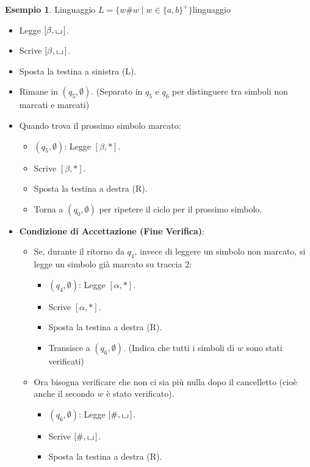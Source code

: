 \documentclass[a4paper]{article}
\theoremstyle{definition} %
\newtheorem{example}{Esempio}
\newcommand{\blankS}{\ensuremath{\raisebox{-0.15ex}{\scalebox{1.3}[0.7]{$\sqcup$}}\mkern2mu}}
\begin{document}
\begin{example}{Linguaggio $L = \{w\#w \mid w \in \{a,b\}^+\}$}{linguaggio}
\begin{itemize}
\begin{itemize}
            \item Legge $[\beta, \blankS]$.
            \item Scrive $[\beta, \blankS]$.
            \item Sposta la testina a sinistra (L).
            \item Rimane in $(q_5, \emptyset)$. (Separato in $q_5$ e $q_6$ per distinguere tra simboli non marcati e marcati)
            \item Quando trova il prossimo simbolo marcato:
                \begin{itemize}
                    \item $(q_5, \emptyset)$: Legge $[\beta, *]$.
                    \item Scrive $[\beta, *]$.
                    \item Sposta la testina a destra (R).
                    \item Torna a $(q_0, \emptyset)$ per ripetere il ciclo per il prossimo simbolo.
                \end{itemize}
            \item \textbf{Condizione di Accettazione (Fine Verifica)}:
                \begin{itemize}
                    \item Se, durante il ritorno da $q_4$, invece di leggere un simbolo non marcato, si legge un simbolo già marcato su traccia 2:
                        \begin{itemize}
                            \item $(q_4, \emptyset)$: Legge $[\alpha, *]$.
                            \item Scrive $[\alpha, *]$.
                            \item Sposta la testina a destra (R).
                            \item Transisce a $(q_6, \emptyset)$. (Indica che tutti i simboli di $w$ sono stati verificati)
                        \end{itemize}
                    \item Ora bisogna verificare che non ci sia più nulla dopo il cancelletto (cioè anche il secondo $w$ è stato verificato).
                        \begin{itemize}
                            \item $(q_6, \emptyset)$: Legge $[\#, \blankS]$.
                            \item Scrive $[\#, \blankS]$.
                            \item Sposta la testina a destra (R).

\end{itemize}
\end{itemize}
\end{itemize}
\end{itemize}
\end{example}
\end{document}
